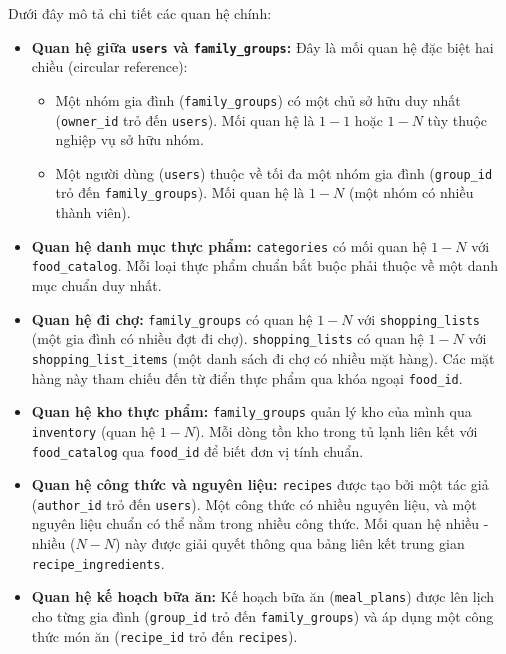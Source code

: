 \documentclass[12pt,a4paper]{article}
\begin{document}
Dưới đây mô tả chi tiết các quan hệ chính:
\begin{itemize}
    \item \textbf{Quan hệ giữa \texttt{users} và \texttt{family\_groups}:} 
    Đây là mối quan hệ đặc biệt hai chiều (circular reference):
    \begin{itemize}
        \item Một nhóm gia đình (\texttt{family\_groups}) có một chủ sở hữu duy nhất (\texttt{owner\_id} trỏ đến \texttt{users}). Mối quan hệ là $1 - 1$ hoặc $1 - N$ tùy thuộc nghiệp vụ sở hữu nhóm.
        \item Một người dùng (\texttt{users}) thuộc về tối đa một nhóm gia đình (\texttt{group\_id} trỏ đến \texttt{family\_groups}). Mối quan hệ là $1 - N$ (một nhóm có nhiều thành viên).
    \end{itemize}
    \item \textbf{Quan hệ danh mục thực phẩm:} 
    \texttt{categories} có mối quan hệ $1 - N$ với \texttt{food\_catalog}. Mỗi loại thực phẩm chuẩn bắt buộc phải thuộc về một danh mục chuẩn duy nhất.
    \item \textbf{Quan hệ đi chợ:}
    \texttt{family\_groups} có quan hệ $1 - N$ với \texttt{shopping\_}\allowbreak\texttt{lists} (một gia đình có nhiều đợt đi chợ). \texttt{shopping\_}\allowbreak\texttt{lists} có quan hệ $1 - N$ với \texttt{shopping\_}\allowbreak\texttt{list\_}\allowbreak\texttt{items} (một danh sách đi chợ có nhiều mặt hàng). Các mặt hàng này tham chiếu đến từ điển thực phẩm qua khóa ngoại \texttt{food\_id}.
    \item \textbf{Quan hệ kho thực phẩm:}
    \texttt{family\_groups} quản lý kho của mình qua \texttt{inventory} (quan hệ $1 - N$). Mỗi dòng tồn kho trong tủ lạnh liên kết với \texttt{food\_catalog} qua \texttt{food\_id} để biết đơn vị tính chuẩn.
    \item \textbf{Quan hệ công thức và nguyên liệu:}
    \texttt{recipes} được tạo bởi một tác giả (\texttt{author\_id} trỏ đến \texttt{users}). Một công thức có nhiều nguyên liệu, và một nguyên liệu chuẩn có thể nằm trong nhiều công thức. Mối quan hệ nhiều - nhiều ($N - N$) này được giải quyết thông qua bảng liên kết trung gian \texttt{recipe\_ingredients}.
    \item \textbf{Quan hệ kế hoạch bữa ăn:}
    Kế hoạch bữa ăn (\texttt{meal\_plans}) được lên lịch cho từng gia đình (\texttt{group\_id} trỏ đến \texttt{family\_groups}) và áp dụng một công thức món ăn (\texttt{recipe\_id} trỏ đến \texttt{recipes}).
\end{itemize}
\end{document}
